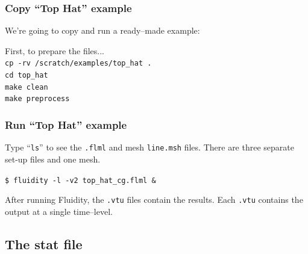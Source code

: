 \documentclass[12pt]{beamer}
\begin{document}
\begin{frame}
    \frametitle{Copy ``Top Hat'' example}

We're going to copy and run a ready--made example:

\vspace{5mm}
First, to prepare the files...\\
{\tt cp -rv /scratch/examples/top\_hat .}\\
{\tt cd top\_hat}\\
{\tt make clean}\\
{\tt make preprocess}

\end{frame}

\begin{frame}
    \frametitle{Run ``Top Hat'' example}

Type ``{\tt ls}'' to see the {\tt .flml} and mesh {\tt line.msh} files.
There are three separate set-up files and one mesh.

\vspace{5mm}
{\tt \$ fluidity -l -v2 top\_hat\_cg.flml \&}\\
\vspace{5mm}

After running Fluidity, the {\tt .vtu} files contain the results. Each {\tt .vtu} contains the output at a single time--level.

\end{frame}

\subsection{The stat file}
\end{document}
